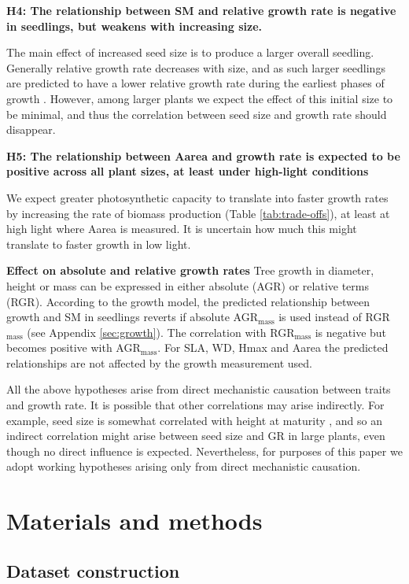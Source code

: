 \documentclass[a4paper,11pt]{article}
\begin{document}
\textbf{H4: The relationship between SM and relative growth rate is negative in seedlings, but weakens with increasing size.}

The main effect of increased seed size is to produce a larger overall seedling. Generally relative growth rate decreases with size, and as such larger seedlings are predicted to have a lower relative growth rate during the earliest phases of growth \citep{Turnbull:2012ew}. However, among larger plants we expect the effect of this initial size to be minimal, and thus the correlation between seed size and growth rate should disappear.

\textbf{H5: The relationship between Aarea and growth rate is expected to be positive across all plant sizes, at least under high-light conditions}

We expect greater photosynthetic capacity to translate into faster growth rates by increasing the rate of biomass production (Table \ref{tab:trade-offs}), at least at high light where Aarea is measured. It is uncertain how much this might translate to faster growth in low light.

\textbf{Effect on absolute and relative growth rates}
Tree growth in diameter, height or mass can be expressed in either absolute (AGR) or relative terms (RGR). According to the growth model, the predicted relationship between growth and SM in seedlings reverts if absolute AGR$_\textrm{mass}$ is used instead of RGR$_\textrm{mass}$ (see Appendix \ref{sec:growth}). The correlation with RGR$_\textrm{mass}$ is negative but becomes positive with AGR$_\textrm{mass}$. For SLA, WD, Hmax and Aarea the predicted relationships are not affected by the growth measurement used.

All the above hypotheses arise from direct mechanistic causation between traits and growth rate. It is possible that other correlations may arise indirectly. For example, seed size is somewhat correlated with height at maturity \citep{Westoby:2009ch}, and so an indirect correlation might arise between seed size and GR in large plants, even though no direct influence is expected. Nevertheless, for purposes of this paper we adopt working hypotheses arising only from direct mechanistic causation. 

\section*{Materials and methods}\label{material-and-methods}

\subsection*{Dataset construction}\label{data-construction}
\end{document}
